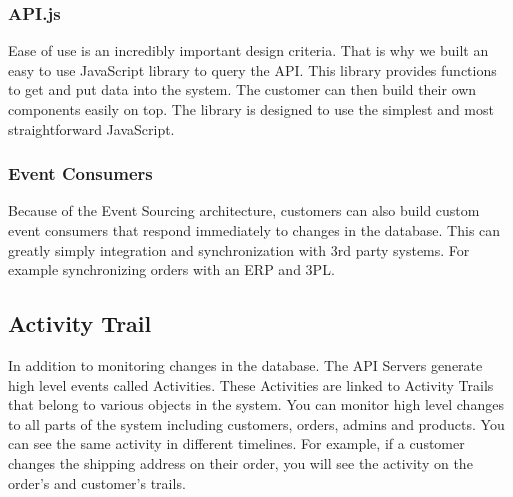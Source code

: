 \documentclass[11pt]{article}
\begin{document}

\subsubsection{API.js}

Ease of use is an incredibly important design criteria. That is why we built 
an easy to use JavaScript library to query the API. This library provides functions
to get and put data into the system. The customer can then build their own components
easily on top. The library is designed to use the simplest and most
straightforward JavaScript.

\subsubsection{Event Consumers}

Because of the Event Sourcing architecture, customers can also build custom
event consumers that respond immediately to changes in the database. This can 
greatly simply integration and synchronization with 3rd party systems. For example
synchronizing orders with an ERP and 3PL. 



\subsection{Activity Trail}

In addition to monitoring changes in the database. The API Servers generate
high level events called Activities. These Activities are linked to Activity Trails that
belong to various objects in the system. You can monitor high level changes to all parts
of the system including customers, orders, admins and products. You can see the same activity in 
different timelines. For example, if a customer changes the shipping address on their order,
you will see the activity on the order's and customer's trails.
\end{document}
